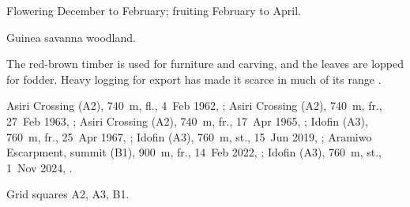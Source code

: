  Flowering December to February; fruiting February
to April.

 Guinea savanna woodland.

 The red-brown timber is used for furniture and carving,
and the leaves are lopped for fodder. Heavy logging for export has
made it scarce in much of its range \citep{arbonnier2004,orwa2009}.

 Asiri Crossing (A2), 740~m, fl., 4~Feb 1962, ;
Asiri Crossing (A2), 740~m, fr., 27~Feb 1963, ;
Asiri Crossing (A2), 740~m, fr., 17~Apr 1965, ;
Idofin (A3), 760~m, fr., 25~Apr 1967, ;
Idofin (A3), 760~m, st., 15~Jun 2019, ;
Aramiwo Escarpment, summit (B1), 900~m, fr., 14~Feb 2022, ;
Idofin (A3), 760~m, st., 1~Nov 2024, .

 Grid squares A2, A3, B1.

\begin{center}
\end{center}
